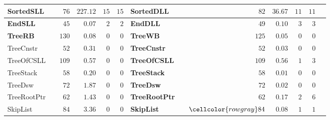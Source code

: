 {\begin{table}[t]
\begin{tabular}{| l | l | r | r | r | r || l | l | r | r | r | r | r |}
        \hline
		\rowcolor{rowgray}
		\textbf{SortedSLL}   & \safe & $76$ & $227.12$ &  $15$ & $15$ & \textbf{SortedDLL} & \safe & $82$ &  $36.67$ & $11$ & $11$ \\
        \hline
		\rowcolor{rowgray}
		\textbf{EndSLL}      & \safe  & $45$ & $0.07$   &  $2$  & $2$ & \textbf{EndDLL} & \safe & $49$ &  $0.10$  & $3$ & $3$ \\
        \hline
		\rowcolor{rowgray}
		\textbf{TreeRB} & \unsafe & $130$ &  $0.08$  & $0$  & $0$ & \textbf{TreeWB} & \unsafe & $125$ &  $0.05$  & $0$ & $0$ \\
        \hline
		TreeCnstr & \safe & $52$ & $0.31$  & $0$  & $0$ & \cellcolor{rowgray}\textbf{TreeCnstr} & \cellcolor{rowgray}\unsafe & \cellcolor{rowgray} $52$ & \cellcolor{rowgray} $0.03$  & \cellcolor{rowgray} $0$ & \cellcolor{rowgray} $0$ \\
        \hline
		TreeOfCSLL & \safe & $109$ &  $0.57$  & $0$  & $0$ & \cellcolor{rowgray}\textbf{TreeOfCSLL}  & \cellcolor{rowgray}\unsafe & \cellcolor{rowgray} $109$ & \cellcolor{rowgray} $0.56$  & \cellcolor{rowgray} $1$ & \cellcolor{rowgray} $3$ \\
        \hline
		TreeStack & \safe & $58$ &  $0.20$  & $0$  & $0$ & \cellcolor{rowgray}\textbf{TreeStack} & \cellcolor{rowgray}\unsafe & \cellcolor{rowgray} $58$ & \cellcolor{rowgray} $0.01$  & \cellcolor{rowgray} $0$ & \cellcolor{rowgray} $0$ \\
        \hline
		TreeDsw   & \safe & $72$ & $1.87$  & $0$  & $0$ & \cellcolor{rowgray}\textbf{TreeDsw} & \cellcolor{rowgray}\unsafe & \cellcolor{rowgray} $72$ & \cellcolor{rowgray} $0.02$  & \cellcolor{rowgray} $0$ &  \cellcolor{rowgray} $0$ \\
		\hline
		TreeRootPtr & \safe & $62$ &  $1.43$  & $0$  &  $0$ & \cellcolor{rowgray}\textbf{TreeRootPtr} & \cellcolor{rowgray}\unsafe & \cellcolor{rowgray} $62$ & \cellcolor{rowgray} $0.17$  & \cellcolor{rowgray} $2$ & \cellcolor{rowgray} $6$\\
        \hline
		SkipList    & \safe & $84$ & $3.36$  & $0$  & $0$ & \cellcolor{rowgray}\textbf{SkipList} & \cellcolor{rowgray}\unsafe & $\cellcolor{rowgray} 84$ & \cellcolor{rowgray} $0.08$  & \cellcolor{rowgray} $1$  & \cellcolor{rowgray} $1$ \\
        \hline
	\end{tabular}
	\label{tab:times}
  \vspace{-5mm}
\end{table}

}
